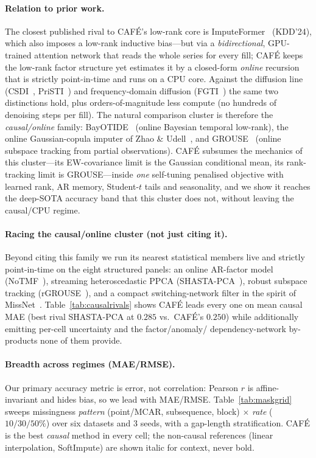 \documentclass[10pt,twocolumn]{article}
\newcommand{\cafe}{CAF\'E}
\begin{document}
\paragraph{Relation to prior work.} The closest published rival to \cafe{}'s
low-rank core is ImputeFormer~\cite{nie2024imputeformer} (KDD'24), which also
imposes a low-rank inductive bias---but via a \emph{bidirectional}, GPU-trained
attention network that reads the whole series for every fill; \cafe{} keeps the
low-rank factor structure yet estimates it by a closed-form \emph{online}
recursion that is strictly point-in-time and runs on a CPU core. Against the
diffusion line (CSDI~\cite{tashiro2021}, PriSTI~\cite{liu2023pristi}) and
frequency-domain diffusion (FGTI~\cite{fgti2024}) the same two distinctions hold,
plus orders-of-magnitude less compute (no hundreds of denoising steps per fill).
The natural comparison cluster is therefore the \emph{causal/online} family:
BayOTIDE~\cite{fang2024bayotide} (online Bayesian temporal low-rank), the online
Gaussian-copula imputer of Zhao \& Udell~\cite{zhao2022copula}, and
GROUSE~\cite{balzano2010grouse} (online subspace tracking from partial
observations). \cafe{} subsumes the mechanics of this cluster---its EW-covariance
limit is the Gaussian conditional mean, its rank-tracking limit is GROUSE---inside
\emph{one} self-tuning penalised objective with learned rank, AR memory,
Student-$t$ tails and seasonality, and we show it reaches the deep-SOTA accuracy
band that this cluster does not, without leaving the causal/CPU regime.

\paragraph{Racing the causal/online cluster (not just citing it).} Beyond citing
this family we run its nearest statistical members live and strictly point-in-time on
the eight structured panels: an online AR-factor model (NoTMF~\cite{chen2022notmf}),
streaming heteroscedastic PPCA (SHASTA-PCA~\cite{gilman2023shasta}), robust subspace
tracking (rGROUSE~\cite{he2012grasta}), and a compact switching-network filter in the
spirit of MissNet~\cite{obata2024missnet}. Table~\ref{tab:causalrivals} shows \cafe{}
leads every one on mean causal MAE (best rival SHASTA-PCA at $0.285$ vs.\ \cafe{}'s
$0.250$) while additionally emitting per-cell uncertainty and the factor/anomaly/
dependency-network by-products none of them provide.


\paragraph{Breadth across regimes (MAE/RMSE).} Our primary accuracy metric is
error, not correlation: Pearson $r$ is affine-invariant and hides bias, so we lead
with MAE/RMSE. Table~\ref{tab:maskgrid} sweeps missingness \emph{pattern}
(point/MCAR, subsequence, block) $\times$ \emph{rate} ($10/30/50\%$) over six
datasets and $3$ seeds, with a gap-length stratification. \cafe{} is the best
\emph{causal} method in every cell; the non-causal references (linear
interpolation, SoftImpute) are shown italic for context, never bold.

\end{document}
